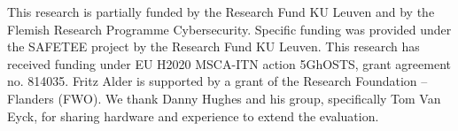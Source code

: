 
\begin{acks} %
%
This research is partially funded by the Research Fund KU Leuven and by the
Flemish Research Programme Cybersecurity. Specific funding was provided under
the SAFETEE project by the Research Fund KU Leuven. This research has received
funding under EU H2020 MSCA-ITN action 5GhOSTS, grant agreement no. 814035.
Fritz Alder is supported by a grant of the Research Foundation – Flanders (FWO).
We thank Danny Hughes and his group, specifically Tom Van Eyck, for sharing
hardware and experience to extend the evaluation.
%
\end{acks}

